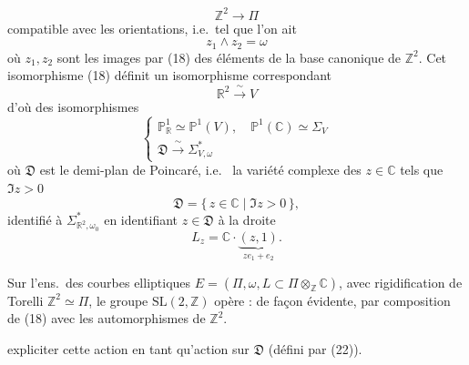 \documentclass[11pt,a4paper]{article}
\begin{document}
\[
  \mathbb{Z}^2 \longrightarrow \Pi \tag{18}
\]
compatible avec les orientations, i.e.\ tel que l'on ait
\[
  z_1 \wedge z_2 = \omega \tag{19}
\]
où $z_1, z_2$ sont les images par (18) des éléments de la base canonique de $\mathbb{Z}^2$.
Cet isomorphisme (18) définit un isomorphisme correspondant
\[
  \mathbb{R}^2 \xrightarrow{\;\sim\;} V \tag{20}
\]
d'où des isomorphismes
\[
  \begin{cases}
    \mathbb{P}^1_{\mathbb{R}} \simeq \mathbb{P}^1(V), \quad \mathbb{P}^1(\mathbb{C}) \simeq \Sigma_V \\
    \mathfrak{D} \xrightarrow{\;\sim\;} \Sigma^*_{V,\omega}
  \end{cases} \tag{21}
\]
où $\mathfrak{D}$ est le demi-plan de Poincaré, i.e.\ \struck{\ill{}} la variété complexe des
$z \in \mathbb{C}$ tels que  $\Im z > 0$
\[
  \mathfrak{D} = \{\, z \in \mathbb{C} \mid \Im z > 0 \,\}, \tag{22}
\]
identifié à $\Sigma^*_{\mathbb{R}^2, \omega_0}$ en identifiant $z \in \mathfrak{D}$ à la droite
\[
  L_z = \mathbb{C}\cdot\underset{z e_1 + e_2}{\underbrace{(z, 1)}} . \tag{23}
\]

Sur l'ens.\ des \struck{\ill{}}  courbes elliptiques
$E = (\Pi, \omega, L \subset \Pi \otimes_{\mathbb{Z}} \mathbb{C})$, avec rigidification de Torelli
$\mathbb{Z}^2 \simeq \Pi$, le groupe $\mathrm{SL}(2, \mathbb{Z})$ opère :  
de façon évidente, par composition  de (18) avec les automorphismes de $\mathbb{Z}^2$.
 

expliciter cette action en tant qu'action sur $\mathfrak{D}$ (défini par (22)).
\end{document}
